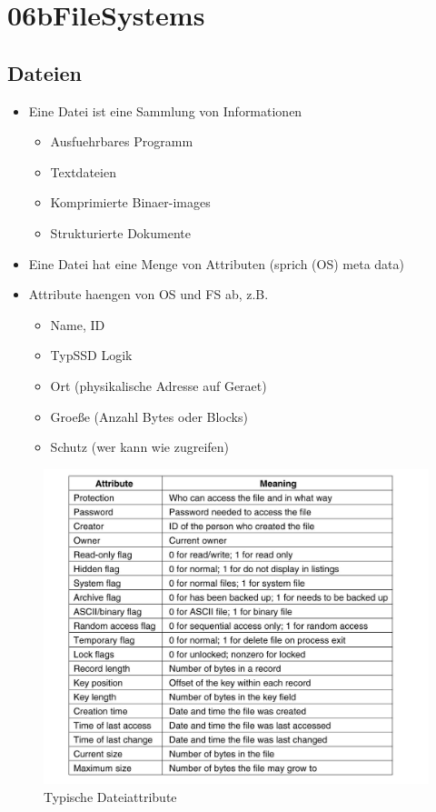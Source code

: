 \documentclass[a4paper]{scrreprt}
\begin{document}
\chapter{06bFileSystems}

\section{Dateien}
\begin{itemize}
	\item Eine Datei ist eine Sammlung von Informationen
		\begin{itemize}
			\item Ausfuehrbares Programm
			\item Textdateien
			\item Komprimierte Binaer-images
			\item Strukturierte Dokumente
		\end{itemize}
	\item Eine Datei hat eine Menge von Attributen (sprich (OS) meta data)
	\item Attribute haengen von OS und FS ab, z.B.
		\begin{itemize}
			\item Name, ID
			\item TypSSD Logik
			\item Ort (physikalische Adresse auf Geraet)
			\item Groeße (Anzahl Bytes oder Blocks)
			\item Schutz (wer kann wie zugreifen)
		\end{itemize}
\end{itemize}

\begin{figure}[ht]
\centering
\includegraphics[scale=0.25]{graphics/file_attributes.png}
\caption{Typische Dateiattribute}
\end{figure}
\end{document}
